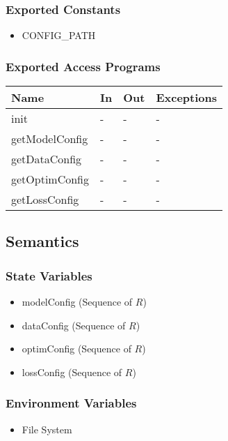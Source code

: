 \documentclass[12pt, titlepage]{article}
\begin{document}
\subsubsection{Exported Constants}
\begin{itemize}
  \item CONFIG\_PATH
\end{itemize}


\subsubsection{Exported Access Programs}

\begin{center}
\begin{tabular}{p{3cm}|p{5cm}|p{2cm}|p{2cm}}
\hline
\textbf{Name} & \textbf{In} & \textbf{Out} & \textbf{Exceptions} \\
\hline
init & - & - & - \\
\hline
getModelConfig & - & - & - \\
\hline
getDataConfig & - & - & - \\
\hline
getOptimConfig & - & - & - \\
\hline
getLossConfig & - & - & - \\
\hline
\end{tabular}
\end{center}

\subsection{Semantics}

\subsubsection{State Variables}

\begin{itemize}
  \item modelConfig (Sequence of $R$)
  \item dataConfig (Sequence of $R$)
  \item optimConfig (Sequence of $R$)
  \item lossConfig (Sequence of $R$)
\end{itemize}

\subsubsection{Environment Variables}

\begin{itemize}
  \item File System
\end{itemize}
\end{document}
